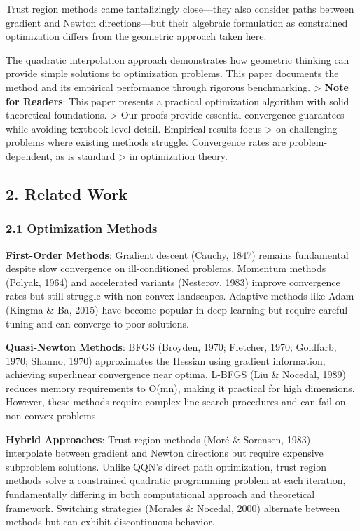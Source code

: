 Trust region methods came tantalizingly close---they also consider paths between gradient and Newton directions---but their
algebraic formulation as constrained optimization differs from the geometric approach taken here.

The quadratic interpolation approach demonstrates how geometric thinking can provide
simple solutions to optimization problems. This paper documents the method and its
empirical performance through rigorous benchmarking.
\textgreater{} \textbf{Note for Readers}: This paper presents a practical optimization algorithm with solid theoretical foundations.
\textgreater{} Our proofs provide essential convergence guarantees while avoiding textbook-level detail. Empirical results focus
\textgreater{} on challenging problems where existing methods struggle. Convergence rates are problem-dependent, as is standard
\textgreater{} in optimization theory.

\hypertarget{related-work}{%
\subsection{2. Related Work}\label{related-work}}

\hypertarget{optimization-methods}{%
\subsubsection{2.1 Optimization Methods}\label{optimization-methods}}

\textbf{First-Order Methods}: Gradient descent (Cauchy, 1847) remains fundamental despite slow convergence on ill-conditioned
problems. Momentum methods (Polyak, 1964) and accelerated variants (Nesterov, 1983) improve convergence rates but still
struggle with non-convex landscapes. Adaptive methods like Adam (Kingma \& Ba, 2015) have become popular in deep learning
but require careful tuning and can converge to poor solutions.

\textbf{Quasi-Newton Methods}: BFGS (Broyden, 1970; Fletcher, 1970; Goldfarb, 1970; Shanno, 1970) approximates the Hessian
using gradient information, achieving superlinear convergence near optima. L-BFGS (Liu \& Nocedal, 1989) reduces memory
requirements to O(mn), making it practical for high dimensions. However, these methods require complex line search
procedures and can fail on non-convex problems.

\textbf{Hybrid Approaches}: Trust region methods (Moré \& Sorensen, 1983) interpolate between gradient and Newton directions
but require expensive subproblem solutions. Unlike QQN's direct path optimization, trust region methods solve a
constrained quadratic programming problem at each iteration, fundamentally differing in both computational approach
and theoretical framework. Switching strategies (Morales \& Nocedal, 2000) alternate between methods but
can exhibit discontinuous behavior.

